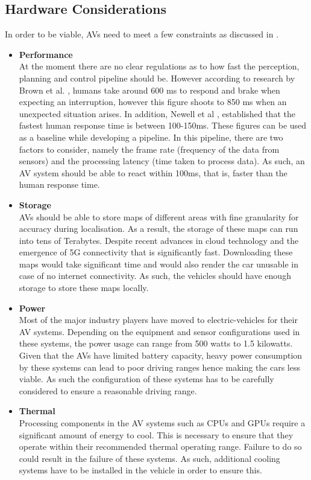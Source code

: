 \subsection{Hardware Considerations}
In order to be viable, AVs need to meet a few constraints as discussed in \cite{lin2018architectural}.
\begin{itemize}
	\item \textbf{Performance} \\
	At the moment there are no clear regulations as to how fast the perception, planning and control pipeline should be. However according to research by Brown et al. \cite{brown1994human}, humans take around 600 ms to respond and brake when expecting an interruption, however this figure shoots to 850 ms when an unexpected situation arises. In addition, Newell et al \cite{newell1985prospects}, established that the fastest human response time is between 100-150ms. These figures can be used as a baseline while developing a pipeline. In this pipeline, there are two factors to consider, namely the frame rate (frequency of the data from sensors) and the processing latency (time taken to process data). As such, an AV system should be able to react within 100ms, that is, faster than the human response time.
	
	\item \textbf{Storage} \\ 
	AVs should be able to store maps of different areas with fine granularity for accuracy during localisation. As a result, the storage of these maps can run into tens of Terabytes. Despite recent advances in cloud technology and the emergence of 5G connectivity that is significantly fast. Downloading these maps would take significant time and would also render the car unusable in case of no internet connectivity. As such, the vehicles should have enough storage to store these maps locally. 
	
	\item \textbf{Power} \\
	Most of the major industry players have moved to electric-vehicles for their AV systems. Depending on the equipment and sensor configurations used in these systems, the power usage can range from 500 watts to 1.5 kilowatts. Given that the AVs have limited battery capacity, heavy power consumption by these systems can lead to poor driving ranges hence making the cars less viable. As such the configuration of these systems has to be carefully considered to ensure a reasonable driving range. 

	\item \textbf{Thermal} \\
	Processing components in the AV systems such as CPUs and GPUs require a significant amount of energy to cool. This is necessary to ensure that they operate within their recommended thermal operating range. Failure to do so could result in the failure of these systems. As such, additional cooling systems have to be installed in the vehicle in order to ensure this.
	
\end{itemize}

